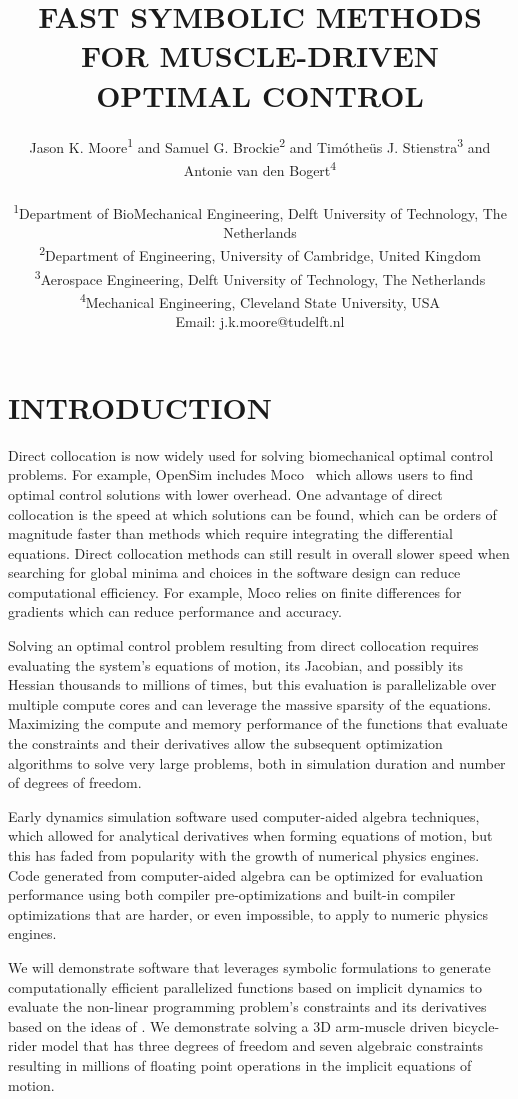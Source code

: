 \documentclass[11pt,twocolumn]{article}
\title{\normalsize\textbf{
  FAST SYMBOLIC METHODS FOR MUSCLE-DRIVEN OPTIMAL CONTROL
}}
\author{
Jason K. Moore\textsuperscript{1} and
Samuel G. Brockie\textsuperscript{2} and
Timótheüs J. Stienstra\textsuperscript{3} and
Antonie van den Bogert\textsuperscript{4} \\
\\
\small
\textsuperscript{1}Department of BioMechanical Engineering, Delft University of Technology, The Netherlands\\
\textsuperscript{2}Department of Engineering, University of Cambridge, United Kingdom\\
\textsuperscript{3}Aerospace Engineering, Delft University of Technology, The Netherlands\\
\textsuperscript{4}Mechanical Engineering, Cleveland State University, USA\\
Email: j.k.moore@tudelft.nl}
\date{}
\begin{document}
\pagestyle{fancy}
\lhead{}
\fancyfoot{}
\maketitle
\section*{INTRODUCTION}
\vspace{-1em}
%
Direct collocation is now widely used for solving biomechanical optimal control
problems. For example, OpenSim includes Moco~\cite{Dembia2019} which allows
users to find optimal control solutions with lower overhead. One advantage of
direct collocation is the speed at which solutions can be found, which can be
orders of magnitude faster than methods which require integrating the
differential equations. Direct collocation methods can still result in overall
slower speed when searching for global minima and choices in the software
design can reduce computational efficiency. For example, Moco relies on finite
differences for gradients which can reduce performance and accuracy.

Solving an optimal control problem resulting from direct collocation requires
evaluating the system's equations of motion, its Jacobian, and possibly its
Hessian thousands to millions of times, but this evaluation is parallelizable
over multiple compute cores and can leverage the massive sparsity of the
equations. Maximizing the compute and memory performance of the functions that
evaluate the constraints and their derivatives allow the subsequent
optimization algorithms to solve very large problems, both in simulation
duration and number of degrees of freedom.

Early dynamics simulation software used computer-aided algebra techniques,
which allowed for analytical derivatives when forming equations of motion, but
this has faded from popularity with the growth of numerical physics engines.
Code generated from computer-aided algebra can be optimized for evaluation
performance using both compiler pre-optimizations and built-in compiler
optimizations that are harder, or even impossible, to apply to numeric physics
engines.

We will demonstrate software that leverages symbolic formulations to generate
computationally efficient parallelized functions based on implicit dynamics to
evaluate the non-linear programming problem's constraints and its derivatives
based on the ideas of \cite{vandenBogert2011a}. We demonstrate solving a 3D
arm-muscle driven bicycle-rider model that has three degrees of freedom and
seven algebraic constraints resulting in millions of floating point operations
in the implicit equations of motion.
\end{document}
